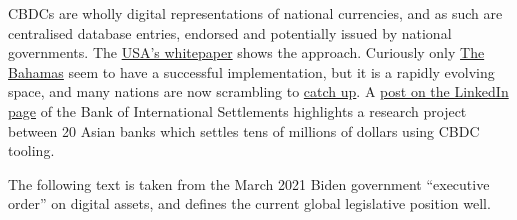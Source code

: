 CBDCs are wholly digital representations of national currencies, and as such are centralised database entries, endorsed and potentially issued by national governments. The \href{https://www.federalreserve.gov/publications/files/money-and-payments-20220120.pdf}{USA's whitepaper} shows the approach. Curiously only \href{https://www.sanddollar.bs/about}{The Bahamas} seem to have a successful implementation, but it is a rapidly evolving space, and many nations are now scrambling to \href{https://twitter.com/GobiernoMX/status/1476376240873517061}{catch up}. A \href{https://www.linkedin.com/feed/update/urn:li:activity:6980330210030145536/}{post on the LinkedIn page} of the Bank of International Settlements highlights a research project between 20 Asian banks which settles tens of millions of dollars using CBDC tooling.\par
The following text is taken from the March 2021 Biden government ``executive order'' on digital assets, and defines the current global legislative position well.\\
